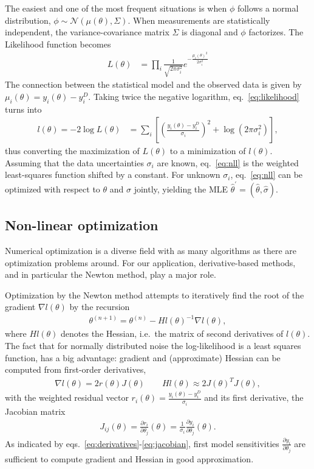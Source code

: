 \documentclass[article]{jss}
\begin{document}
The easiest and one of the most frequent situations is when $\phi$ follows a normal distribution, $\phi\sim\mathcal N(\mu(\theta), \Sigma)$. When measurements are statistically independent, the variance-covariance matrix $\Sigma$ is diagonal and $\phi$ factorizes. The Likelihood function becomes
\begin{align}
	L(\theta) &= \prod_i \frac{1}{\sqrt{2\pi\sigma_i^2}} e^{-\frac{\mu_i(\theta)^2}{2\sigma_i^2}} 
	\label{eq:likelihood}
\end{align}
The connection between the statistical model and the observed data is given by $\mu_i(\theta) = y_i(\theta) - y_i^D$. Taking twice the negative logarithm, eq.~\eqref{eq:likelihood} turns into
\begin{align}
	l(\theta) = -2\log L(\theta) &= \sum_i \left[\left(\frac{y_i(\theta) - y_i^D}{\sigma_i}\right)^2 + \log(2\pi\sigma_i^2)\right],
	\label{eq:nll}
\end{align}
thus converting the maximization of $L(\theta)$ to a minimization of $l(\theta)$. 
Assuming that the data uncertainties $\sigma_i$ are known, eq.~\eqref{eq:nll} is the weighted least-squares function shifted by a constant. For unknown $\sigma_i$, eq.~\eqref{eq:nll} can be optimized with respect to $\theta$ and $\sigma$ jointly, yielding the MLE $\hat\theta^{\prime} = (\hat\theta, \hat\sigma)$.

\subsection{Non-linear optimization}

Numerical optimization is a diverse field with as many algorithms as there are optimization problems around. For our application, derivative-based methods, and in particular the Newton method, play a major role.

Optimization by the Newton method attempts to iteratively find the root of the gradient $\nabla l (\theta)$ by the recursion
\begin{align}
	\theta^{(n+1)} = \theta^{(n)} - Hl(\theta)^{-1}\nabla l(\theta),
	\label{eq:newton}
\end{align}
where $Hl(\theta)$ denotes the Hessian, i.e.~the matrix of second derivatives of $l(\theta)$. The fact that for normally distributed noise the log-likelihood is a least squares function, has a big advantage: gradient and (approximate) Hessian can be computed from first-order derivatives,
\begin{align}
	\nabla l(\theta) = 2 r(\theta) J(\theta) \quad\quad Hl(\theta) \approx 2 J(\theta)^T J(\theta),
	\label{eq:derivatives}
\end{align}
with the weighted residual vector $r_i(\theta) = \frac{y_i(\theta) - y_i^D}{\sigma_i}$ and its first derivative, the Jacobian matrix 
\begin{align}
	J_{ij}(\theta) = \frac{\partial r_i}{\partial \theta_j}(\theta) = \frac{1}{\sigma_i} \frac{\partial y_i}{\partial \theta_j}(\theta). \label{eq:jacobian}
\end{align}
As indicated by eqs.~\eqref{eq:derivatives}-\eqref{eq:jacobian},  first model sensitivities $\frac{\partial y_i}{\partial\theta_j}$ are sufficient to compute gradient and Hessian in good approximation.
\end{document}
